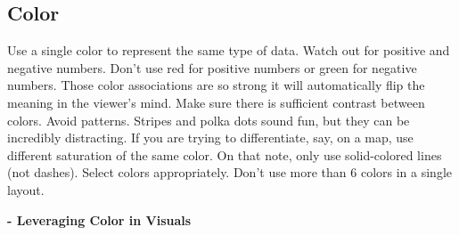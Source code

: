\documentclass[]{book}
\begin{document}
\subsection{Color}\label{color}

Use a single color to represent the same type of data. Watch out for
positive and negative numbers. Don't use red for positive numbers or
green for negative numbers. Those color associations are so strong it
will automatically flip the meaning in the viewer's mind. Make sure
there is sufficient contrast between colors. Avoid patterns. Stripes and
polka dots sound fun, but they can be incredibly distracting. If you are
trying to differentiate, say, on a map, use different saturation of the
same color. On that note, only use solid-colored lines (not dashes).
Select colors appropriately. Don't use more than 6 colors in a single
layout.

\textbf{- Leveraging Color in Visuals}
\end{document}

